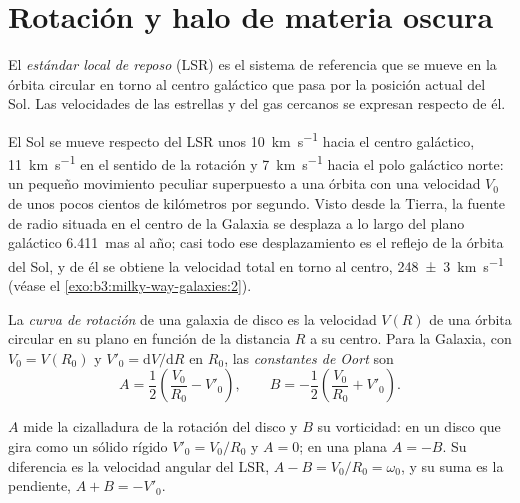 \section{Rotación y halo de materia oscura}\label{sec:b3:milky-way-galaxies:rotation}

\begin{definition}\label{def:b3:milky-way-galaxies:lsr}
El \emph{estándar local de reposo} (LSR) es
el sistema de referencia que se mueve en la órbita circular en torno al
centro galáctico que pasa por la posición actual del Sol. Las velocidades de las
estrellas y del gas cercanos se expresan respecto de él.
\end{definition}

El Sol se mueve respecto del LSR unos \qty{10}{km.s^{-1}} hacia el
centro galáctico, \qty{11}{km.s^{-1}} en el sentido de la rotación y
\qty{7}{km.s^{-1}} hacia el polo galáctico norte: un pequeño movimiento peculiar
superpuesto a una órbita con una velocidad $V_0$ de unos pocos cientos de kilómetros
por segundo. Visto desde la Tierra, la fuente de radio situada en el centro de la
Galaxia se desplaza a lo largo del plano galáctico \qty{6.411}{mas} al año; casi
todo ese desplazamiento es el reflejo de la órbita del Sol, y de él se obtiene la
velocidad total en torno al centro, \qty[separate-uncertainty=true]{248 \pm 3}{km.s^{-1}}
(véase el \cref{exo:b3:milky-way-galaxies:2}).

\begin{definition}\label{def:b3:milky-way-galaxies:rotation-curve}
La \emph{curva de rotación} de una galaxia de disco es la
velocidad $V(R)$ de una órbita circular en su plano en función de la
distancia $R$ a su centro. Para la Galaxia, con $V_0 = V(R_0)$ y
$V'_0 = \mathrm{d}V/\mathrm{d}R$ en $R_0$, las \emph{constantes
de Oort} son
\[
A = \frac12\left(\frac{V_0}{R_0} - V'_0\right), \qquad
B = -\frac12\left(\frac{V_0}{R_0} + V'_0\right).
\]
\end{definition}

$A$ mide la cizalladura de la rotación del disco y $B$ su vorticidad: en un
disco que gira como un sólido rígido $V'_0 = V_0/R_0$ y $A = 0$; en una
 plana $A = -B$. Su diferencia es la velocidad angular del LSR,
$A - B = V_0/R_0 = \omega_0$, y su suma es la pendiente, $A + B = -V'_0$.


